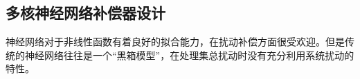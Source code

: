 \subsection{多核神经网络补偿器设计}
神经网络对于非线性函数有着良好的拟合能力，在扰动补偿方面很受欢迎\cite{zhao2019adaptive,sun2019adaptive}。但是传统的神经网络往往是一个“黑箱模型”，在处理集总扰动时没有充分利用系统扰动的特性。

